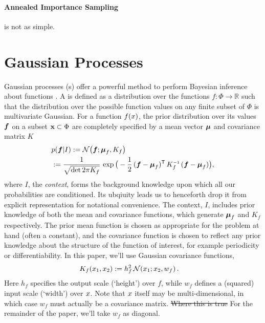 \documentclass{article}
\begin{document}
\paragraph*{Annealed Importance Sampling} is not as simple.
\citep{neal2001annealed}

\section{Gaussian Processes}
Gaussian processes (\gp s) offer a powerful method to perform Bayesian
inference about functions \citep{GPsBook}. A \gpb is defined as a
distribution over the functions $f: \Phi \rightarrow \mathbb{R}$ such
that the distribution over the possible function values on any finite
subset of $\Phi$ is multivariate Gaussian.  For a function $f(\lfv)$,
the prior distribution over its values $\vf$ on a subset
$\vlfv \subset \Phi$ are completely specified by a mean vector
$\vmu$ and covariance matrix $K$
\begin{align*}%
\textstyle
 &\p{\vf}{I} \deq \N{\vf}{\vmu_{f}}{K_{f}}\\
 &\deq\frac{1}{\sqrt{\det{2\pi K_{f}}}}\,\exp \big(-\frac{1}{2}\,(\vf-\vmu_{f})\tra\,K_{f}\inv\,(\vf-\vmu_{f})\big),
\end{align*}
where $I$, the \emph{context}, forms the background knowledge upon which all our probabilities are conditioned. Its ubqiuity leads us to henceforth drop it from explicit representation for notational convenience. The context, $I$, includes prior knowledge of both the
mean and covariance functions, which generate $\vmu_{f}$ and
$K_{f}$ respectively. The prior mean function is chosen as
appropriate for the problem at hand (often a constant), and the
covariance function is chosen to reflect any prior knowledge about the
structure of the function of interest, for example periodicity or
differentiability. In this paper, we'll use Gaussian
covariance functions,
\begin{align} \label{eq:Gaussian_cov_fn}
\textstyle
K_{f}(\lfv_1,\lfv_2)& \deq h_f^2\,\N{\lfv_1}{\lfv_2}{w_{f}}.
\end{align} 
Here $h_f$ specifies the output scale (`height') over $f$, while $w_f$ defines a (squared) input scale (`width') over $\lfv$. Note that $\lfv$ itself may be multi-dimensional, in which case $w_f$ must actually be a covariance matrix. \sout{Where this is true} For the remainder of the paper, we'll take $w_f$ as diagonal. 
\end{document}
